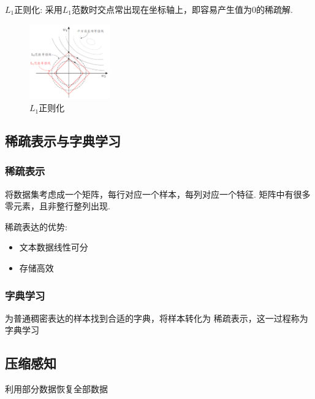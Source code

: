{$L_1$}正则化: 采用$L_1$范数时交点常出现在坐标轴上，即容易产生值为0的稀疏解. 

\begin{figure}[!htb]
    \centering
    \includegraphics[width=0.309\textwidth]{pic/L1正则化.png}
    \caption{{$L_1$}正则化}
\end{figure}


\subsection{稀疏表示与字典学习}
\subsubsection{稀疏表示}
将数据集考虑成一个矩阵，每行对应一个样本，每列对应一个特征. 矩阵中有很多零元素，且非整行整列出现. 

稀疏表达的优势:
\begin{itemize}
    \item 文本数据线性可分
    \item 存储高效
\end{itemize}

\subsubsection{字典学习}
为普通稠密表达的样本找到合适的字典，将样本转化为
稀疏表示，这一过程称为字典学习


\subsection{压缩感知}
利用部分数据恢复全部数据